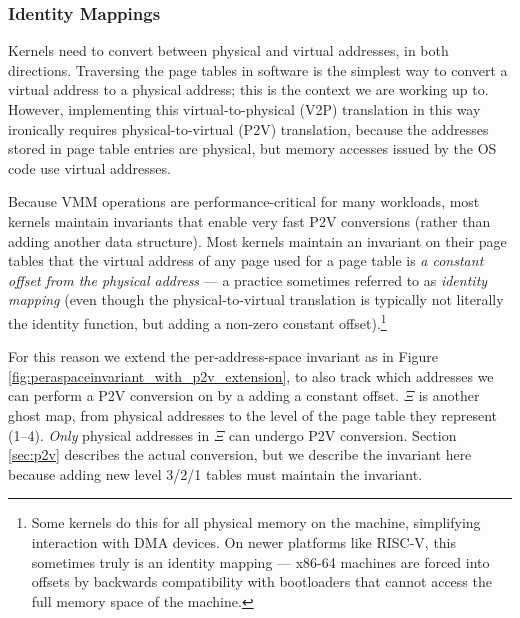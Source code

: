 \subsubsection{Identity Mappings}
\label{subsec:identitymappings}
Kernels need to convert between physical and virtual addresses, in both directions.
Traversing the page tables in software is the simplest way to convert a virtual address to a physical address; this is the context we are working up to.
However, implementing this virtual-to-physical (V2P) translation in this way ironically requires physical-to-virtual (P2V) translation,
because the addresses stored in page table entries are physical, but memory accesses issued by the OS code use virtual addresses.

Because VMM operations are performance-critical for many workloads, most kernels 
maintain invariants that enable very fast P2V conversions (rather than adding another data structure).
Most kernels maintain an invariant on their page tables that the virtual address of any page used for a page table 
is \emph{a constant offset from the physical address} --- a practice sometimes referred to as \emph{identity mapping} 
(even though the physical-to-virtual translation
is typically not literally the identity function, but adding a non-zero constant offset).\footnote{Some kernels do this for all physical memory on the machine, simplifying interaction
with DMA devices.
On newer platforms like RISC-V, this sometimes truly is an identity mapping ---
x86-64 machines are forced into offsets by backwards compatibility with bootloaders that cannot access the full memory space of the
machine.
}

For this reason we extend the per-address-space invariant as in Figure \ref{fig:peraspaceinvariant_with_p2v_extension}, to also track which
addresses we can perform a P2V conversion on by a adding a constant offset.
$\Xi$ is another ghost map, from physical addresses to the level of the page table they represent (1--4).
\emph{Only} physical addresses in $\Xi$ can undergo P2V conversion. 
Section \ref{sec:p2v} describes the actual conversion,
but we describe the invariant here 
because adding new level 3/2/1 tables must maintain the invariant.

